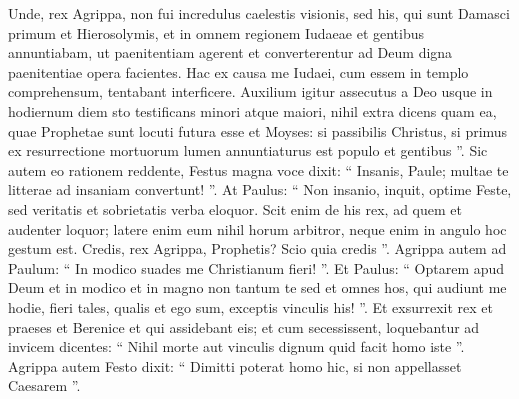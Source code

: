 \begin{biblechapter}
\begin{biblechapter}
\begin{biblechapter}
\begin{biblechapter}
\begin{biblechapter}
\begin{biblechapter}
\begin{biblechapter}
\begin{biblechapter}
\begin{biblechapter}
\begin{biblechapter}
\begin{biblechapter}
\begin{biblechapter}
\begin{biblechapter}
\begin{biblechapter}
\begin{biblechapter}
\begin{biblechapter}
\begin{biblechapter}
\begin{biblechapter}
\begin{biblechapter}
\begin{biblechapter}
\begin{biblechapter}
\begin{biblechapter}
\begin{biblechapter}
\begin{biblechapter}
\begin{biblechapter}
\begin{biblechapter}
 \verse Unde, rex Agrippa, non fui incredulus caelestis visionis, 
\verse sed his, qui sunt Damasci primum et Hierosolymis, et in omnem regionem Iudaeae et gentibus annuntiabam, ut paenitentiam agerent et converterentur ad Deum digna paenitentiae opera facientes. 
\verse Hac ex causa me Iudaei, cum essem in templo comprehensum, tentabant interficere. 
\verse Auxilium igitur assecutus a Deo usque in hodiernum diem sto testificans minori atque maiori, nihil extra dicens quam ea, quae Prophetae sunt locuti futura esse et Moyses: 
\verse si passibilis Christus, si primus ex resurrectione mortuorum lumen annuntiaturus est populo et gentibus ”.
 \verse Sic autem eo rationem reddente, Festus magna voce dixit: “ Insanis, Paule; multae te litterae ad insaniam convertunt! ”. 
\verse At Paulus: “ Non insanio, inquit, optime Feste, sed veritatis et sobrietatis verba eloquor. 
\verse Scit enim de his rex, ad quem et audenter loquor; latere enim eum nihil horum arbitror, neque enim in angulo hoc gestum est. 
\verse Credis, rex Agrippa, Prophetis? Scio quia credis ”. 
\verse Agrippa autem ad Paulum: “ In modico suades me Christianum fieri! ”. 
\verse Et Paulus: “ Optarem apud Deum et in modico et in magno non tantum te sed et omnes hos, qui audiunt me hodie, fieri tales, qualis et ego sum, exceptis vinculis his! ”.
 \verse Et exsurrexit rex et praeses et Berenice et qui assidebant eis; 
\verse et cum secessissent, loquebantur ad invicem dicentes: “ Nihil morte aut vinculis dignum quid facit homo iste ”. 
\verse Agrippa autem Festo dixit: “ Dimitti poterat homo hic, si non appellasset Caesarem ”.
 

\end{biblechapter}
\end{biblechapter}
\end{biblechapter}
\end{biblechapter}
\end{biblechapter}
\end{biblechapter}
\end{biblechapter}
\end{biblechapter}
\end{biblechapter}
\end{biblechapter}
\end{biblechapter}
\end{biblechapter}
\end{biblechapter}
\end{biblechapter}
\end{biblechapter}
\end{biblechapter}
\end{biblechapter}
\end{biblechapter}
\end{biblechapter}
\end{biblechapter}
\end{biblechapter}
\end{biblechapter}
\end{biblechapter}
\end{biblechapter}
\end{biblechapter}
\end{biblechapter}

